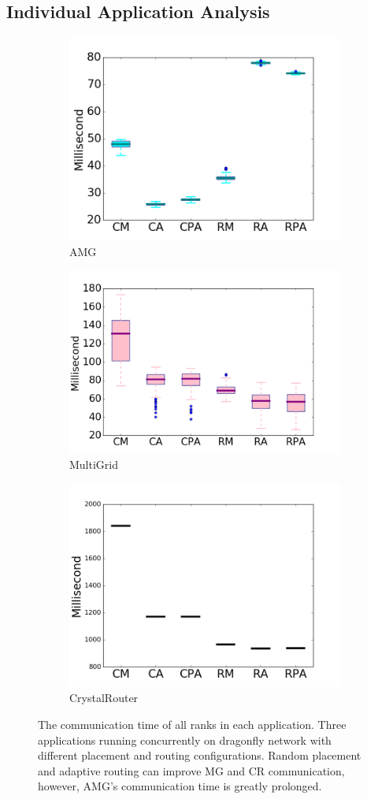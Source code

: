 \documentclass[conference,compsoc]{IEEEtran}
\begin{document}
\subsection{Individual Application Analysis}
\label{sec: workload-1 app analysis}

\begin{figure}[t!]
    \centering
    \begin{subfigure}[t]{0.32\textwidth}
        \centering
        \includegraphics[height=1.5 in]{wkld/amg/commtime}
        \caption{AMG}
        \label{fig:amg-commtime}
    \end{subfigure}%
    \hspace{1em}%
    \begin{subfigure}[t]{0.32\textwidth}
        \centering
        \includegraphics[height=1.5 in]{wkld/mg/commtime}
        \caption{MultiGrid}
        \label{fig:mg-commtime}
    \end{subfigure}%
    \begin{subfigure}[t]{0.32\textwidth}
        \centering
        \includegraphics[height=1.5 in]{wkld/cr/commtime}
        \caption{CrystalRouter}
        \label{fig:cr-commtime}
    \end{subfigure}%
   \caption{The communication time of all ranks in each application. Three applications running concurrently on dragonfly network with different placement and routing configurations. Random placement and adaptive routing can improve MG and CR communication, however, AMG's communication time is greatly prolonged.}
   \label{fig:apps-commtime}
\end{figure}
\end{document}
